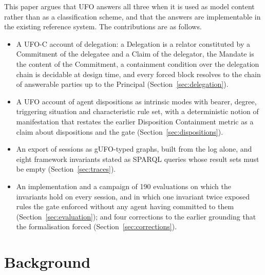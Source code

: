 \documentclass[runningheads]{llncs}
\begin{document}
This paper argues that UFO answers all three when it is used as model content rather than as a classification scheme, and that the answers are implementable in the existing reference system. The contributions are as follows.
\begin{itemize}
  \item A UFO-C account of delegation: a Delegation is a relator constituted by a Commitment of the delegatee and a Claim of the delegator, the Mandate is the content of the Commitment, a containment condition over the delegation chain is decidable at design time, and every forced block resolves to the chain of answerable parties up to the Principal (Section~\ref{sec:delegation}).
  \item A UFO account of agent dispositions as intrinsic modes with bearer, degree, triggering situation and characteristic rule set, with a deterministic notion of manifestation that restates the earlier Disposition Containment metric as a claim about dispositions and the gate (Section~\ref{sec:dispositions}).
  \item An export of sessions as gUFO-typed graphs, built from the log alone, and eight framework invariants stated as SPARQL queries whose result sets must be empty (Section~\ref{sec:traces}).
  \item An implementation and a campaign of 190 evaluations on which the invariants hold on every session, and in which one invariant twice exposed rules the gate enforced without any agent having committed to them (Section~\ref{sec:evaluation}); and four corrections to the earlier grounding that the formalisation forced (Section~\ref{sec:corrections}).
\end{itemize}

\section{Background}
\label{sec:background}
\end{document}
